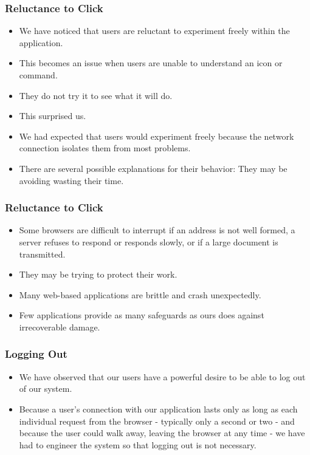 \documentclass{beamer}
\begin{document}
\begin{frame}
\frametitle{Reluctance to Click}

\begin{itemize}
\item We have noticed that users are reluctant to experiment freely within the application.
\item This becomes an issue when users are unable to understand an icon or command.
\item They do not try it to see what it will do.
\item This surprised us.
\item We had expected that users would experiment freely because the network connection isolates them from most problems.
\item There are several possible explanations for their behavior: They may be avoiding wasting their time.
\end{itemize}

\end{frame}

\begin{frame}
\frametitle{Reluctance to Click}

\begin{itemize}
\item Some browsers are difficult to interrupt if an address is not well formed, a server refuses to respond or responds slowly, or if a large document is transmitted.
\item They may be trying to protect their work.
\item Many web-based applications are brittle and crash unexpectedly.
\item Few applications provide as many safeguards as ours does against irrecoverable damage.
\end{itemize}

\end{frame}

\begin{frame}
\frametitle{Logging Out}

\begin{itemize}
\item We have observed that our users have a powerful desire to be able to log out of our system.
\item Because a user's connection with our application lasts only as long as each individual request from the browser - typically only a second or two - and because the user could walk away, leaving the browser at any time - we have had to engineer the system so that logging out is not necessary.
\end{itemize}

\end{frame}
\end{document}
